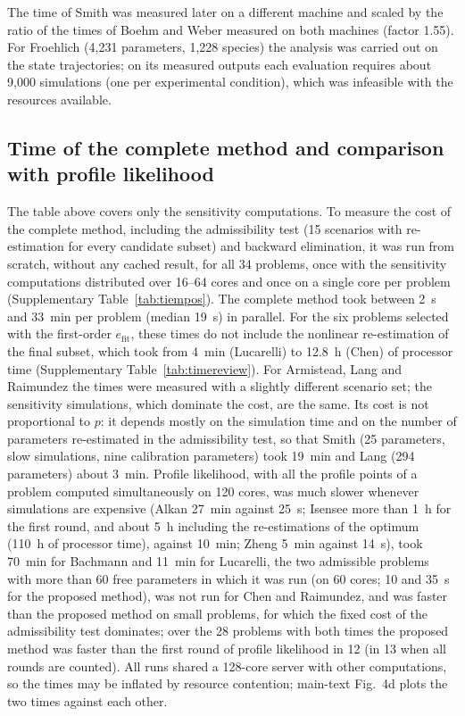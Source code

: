 The time of Smith was measured later on a different machine and scaled by the ratio of the times of Boehm and Weber measured on both machines (factor 1.55). For Froehlich (4,231 parameters, 1,228 species) the analysis was carried out on the state trajectories; on its measured outputs each evaluation requires about 9,000 simulations (one per experimental condition), which was infeasible with the resources available.


\subsection*{Time of the complete method and comparison with profile likelihood}

The table above covers only the sensitivity computations. To measure the cost of the complete method, including the admissibility test (15 scenarios with re-estimation for every candidate subset) and backward elimination, it was run from scratch, without any cached result, for all 34 problems, once with the sensitivity computations distributed over 16--64 cores and once on a single core per problem (Supplementary Table~\ref{tab:tiempos}). The complete method took between 2~s and 33~min per problem (median 19~s) in parallel. For the six problems selected with the first-order $e_{\mathrm{fit}}$, these times do not include the nonlinear re-estimation of the final subset, which took from 4~min (Lucarelli) to 12.8~h (Chen) of processor time (Supplementary Table~\ref{tab:timereview}). For Armistead, Lang and Raimundez the times were measured with a slightly different scenario set; the sensitivity simulations, which dominate the cost, are the same. Its cost is not proportional to $p$: it depends mostly on the simulation time and on the number of parameters re-estimated in the admissibility test, so that Smith (25 parameters, slow simulations, nine calibration parameters) took 19~min and Lang (294 parameters) about 3~min. Profile likelihood, with all the profile points of a problem computed simultaneously on 120 cores, was much slower whenever simulations are expensive (Alkan 27~min against 25~s; Isensee more than 1~h for the first round, and about 5~h including the re-estimations of the optimum (110~h of processor time), against 10~min; Zheng 5~min against 14~s), took 70~min for Bachmann and 11~min for Lucarelli, the two admissible problems with more than 60 free parameters in which it was run (on 60 cores; 10 and 35~s for the proposed method), was not run for Chen and Raimundez, and was faster than the proposed method on small problems, for which the fixed cost of the admissibility test dominates; over the 28 problems with both times the proposed method was faster than the first round of profile likelihood in 12 (in 13 when all rounds are counted). All runs shared a 128-core server with other computations, so the times may be inflated by resource contention; main-text Fig.~4d plots the two times against each other.

{\small

}

